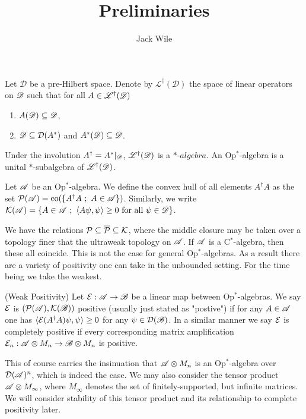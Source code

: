 \documentclass[../main.tex]{subfiles}
\title{Preliminaries}
\author{Jack Wile}
\date{}
\begin{document}
\begin{definition}
	Let $\mathscr{D}$ be a pre-Hilbert space. Denote by $\mathscr{L}^\dagger(\mathscr{D})$
	the space of linear operators on $\mathscr{D}$ such that for all $A \in \mathscr{L}^\dagger(\mathscr{D})$ 

	\begin{enumerate}
		\item $A(\mathscr{D}) \subseteq \mathscr{D}$,
		\item $\mathscr{D} \subseteq \mathcal{D}(A^*)$ and $A^*(\mathscr{D}) \subseteq \mathscr{D}$.
	\end{enumerate}

	\noindent Under the involution $A^\dagger = A^*|_{\mathscr{D}}$, $\mathscr{L}^\dagger(\mathscr{D})$ is a $*\text{-}algebra$. 
	An Op$^*$-algebra is a unital $*$-subalgebra of $\mathscr{L}^\dagger(\mathscr{D})$.
\end{definition}

\begin{definition}
	Let $\mathscr{A}$ be an Op$^*$-algebra. We define the convex hull of all elements $A^\dagger A$ as the set
	$\mathcal{P}(\mathscr{A}) = \text{co}(\{A^\dagger A \ ; \ A \in \mathscr{A}\})$. Similarly, we write
	$\mc{K}(\ms{A}) = \{A \in \ms{A} \ ; \ \ip{A\psi}{\psi} \ge 0 \text{ for all } \psi \in \ms{D}\}$.


\end{definition}

We have the relations $\mathcal{P} \subseteq \overline{\mathcal{P}} \subseteq \mathcal{K}$, where the middle closure may be taken over a
topology finer that the ultraweak topology on $\mathscr{A}$. If $\mathscr{A}$ is a C$^*$-algebra, then these all coincide. This is not 
the case for general Op$^*$-algebras. As a result there are a variety of positivity one can take in the unbounded setting. 
For the time being we take the weakest.


\begin{definition} (Weak Positivity) Let $\mathcal{E}: \mathscr{A} \to \mathscr{B}$ be a linear map between Op$^*$-algebras. 
	We say $\mathcal{E}$ is $(\mathcal{P}(\mathscr{A}), \mathcal{K}(\mathscr{B}))$ positive (usually just stated as "postive")
	if for any $A \in \mathscr{A}$ one has 
	$\langle \mathcal{E}(A^\dagger A)\psi, \psi \rangle \ge 0$ for any $\psi \in \mathcal{D}(\mathscr{B})$. In a similar manner 
	we say $\mathcal{E}$ is completely positive if every corresponding matrix amplification
	$\mathcal{E}_n:\mathscr{A} \otimes M_n \to \mathscr{B} \otimes M_n$ is positive. 
\end{definition}

This of course carries the insinuation that $\mathscr{A} \otimes M_n$ is an Op$^*$-algebra over $\mathcal{D}(\mathscr{A})^n$, which is indeed
the case.
We may also consider the tensor product $\mathscr{A} \otimes M_\infty$, where $M_\infty$ denotes the set of finitely-supported,
but infinite matrices. We will consider stability of this tensor product and its relationship to complete positivity later.
\end{document}
